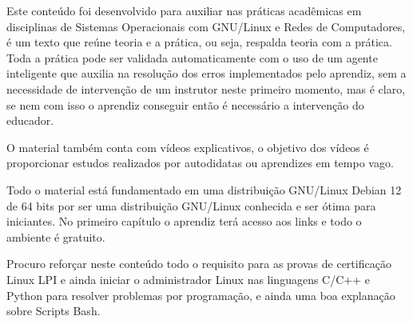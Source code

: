 
Este conteúdo foi desenvolvido para auxiliar nas práticas acadêmicas em disciplinas de Sistemas Operacionais com GNU/Linux e Redes de Computadores, é um texto que reúne teoria e a prática, ou seja, respalda teoria com a prática.
Toda a prática pode ser validada automaticamente com o uso de um agente inteligente que auxilia na resolução dos erros implementados pelo aprendiz, sem a necessidade de intervenção de um instrutor neste primeiro momento, mas é claro, se nem com isso o aprendiz conseguir então é necessário a intervenção do educador.

O material também conta com vídeos explicativos, o objetivo dos vídeos é proporcionar estudos realizados por autodidatas ou aprendizes em tempo vago.

Todo o material está fundamentado em uma distribuição GNU/Linux Debian 12 de 64 bits por ser uma distribuição GNU/Linux conhecida e ser ótima para iniciantes. No primeiro capítulo o aprendiz terá acesso aos links e todo o ambiente é gratuito.

Procuro reforçar neste conteúdo todo o requisito para as provas de certificação Linux LPI e ainda iniciar o administrador Linux nas linguagens C/C++ e Python para resolver problemas por programação, e ainda uma boa explanação sobre Scripts Bash. 
